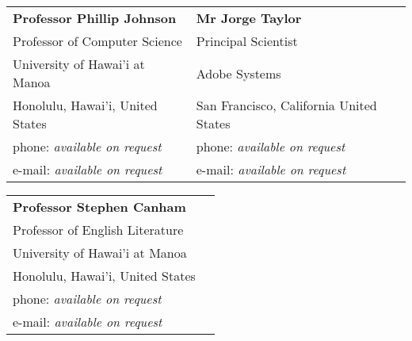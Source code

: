 \documentclass[margin,line]{resume}
\begin{document}
\begin{resume}
  \begin{tabular}{@{}p{6cm}p{6cm}}
    \textbf{Professor Phillip Johnson}      &  \textbf{Mr Jorge Taylor }                \\
    Professor of Computer Science           &  Principal Scientist                      \\
    University of Hawai'i at Manoa          &  Adobe Systems                            \\
    Honolulu, Hawai'i, United States        &  San Francisco, California United States  \\
    phone: \textsl{available on request}    &  phone: \textsl{available on request}     \\
    e-mail: \textsl{available on request}   &  e-mail: \textsl{available on request}    \\
  \end{tabular}

  \begin{tabular}{@{}p{6cm}p{6cm}}
    \textbf{Professor Stephen Canham}       \\
    Professor of English Literature         \\
    University of Hawai'i at Manoa          \\
    Honolulu, Hawai'i, United States        \\
    phone: \textsl{available on request}    \\
    e-mail: \textsl{available on request}   \\
  \end{tabular}

\end{resume}
\end{document}

